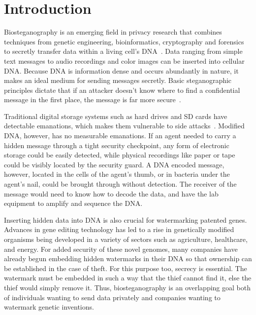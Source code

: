 \documentclass[USenglish,oneside,twocolumn]{article}
\begin{document}
\maketitle
\section{Introduction}

Biosteganography is an emerging field in privacy research that combines techniques from genetic engineering, bioinformatics, cryptography and forensics to secretly transfer data within a living cell's DNA~\cite{B2016JOB}. Data ranging from simple text messages to audio recordings and color images can be inserted into cellular DNA. Because DNA is information dense and occurs abundantly in nature, it makes an ideal medium for sending messages secretly. Basic steganographic principles dictate that if an attacker doesn’t know where to find a confidential message in the first place, the message is far more secure~\cite{A2001IEEEIC}.

Traditional digital storage systems such as hard drives and SD cards have detectable emanations, which makes them vulnerable to side attacks~\cite{T2008TOIAS}. Modified DNA, however, has no measurable emanations. If an agent needed to carry a hidden message through a tight security checkpoint, any form of electronic storage could be easily detected, while physical recordings like paper or tape could be visibly located by the security guard. A DNA encoded message, however, located in the cells of the agent's thumb, or in bacteria under the agent's nail, could be brought through without detection. The receiver of the message would need to know how to decode the data, and have the lab equipment to amplify and sequence the DNA.

Inserting hidden data into DNA is also crucial for watermarking patented genes. Advances in gene editing technology has led to a rise in genetically modified organisms being developed in a variety of sectors such as agriculture, healthcare, and energy. For added security of these novel genomes, many companies have already begun embedding hidden watermarks in their DNA so that ownership can be established in the case of theft. For this purpose too, secrecy is essential. The watermark must be embedded in such a way that the thief cannot find it, else the thief would simply remove it. Thus, biosteganography is an overlapping goal both of individuals wanting to send data privately and companies wanting to watermark genetic inventions.
\end{document}
